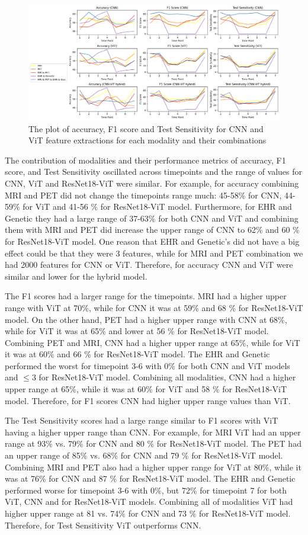 \begin{figure}
    \centering
    \includegraphics[width=1\linewidth]{figs/Picture17_1.png}
    \caption{The plot of accuracy, F1 score and Test Sensitivity for CNN and ViT feature extractions for each modality and their combinations }
    \label{fig:ADprogression}
\end{figure}

The contribution of modalities and their performance metrics of accuracy, F1 score, and Test Sensitivity oscillated across timepoints and the range of values for CNN, ViT and ResNet18-ViT were similar. For example, for accuracy combining MRI and PET did not change the timepoints range much:  45-58\% for CNN, 44-59\% for ViT and 41-56 \% for ResNet18-ViT model. Furthermore, for EHR and Genetic they had a large range of 37-63\% for both CNN and ViT and combining them with MRI and PET did increase the upper range of CNN to 62\% and 60 \% for ResNet18-ViT model. One reason that EHR and Genetic’s did not have a big effect could be that they were 3 features, while for MRI and PET combination we had 2000 features for CNN or ViT. Therefore, for accuracy CNN and ViT were similar and lower for the hybrid model.  

The F1 scores had a larger range for the timepoints. MRI had a higher upper range with ViT at 70\%, while for CNN it was at 59\% and 68 \% for ResNet18-ViT model. On the other hand, PET had a higher upper range with CNN at 68\%, while for ViT it was at 65\% and lower at 56 \% for ResNet18-ViT model. Combining PET and MRI, CNN had a higher upper range at 65\%, while for ViT it was at 60\% and 66 \% for ResNet18-ViT model. The EHR and Genetic performed the worst for timepoint 3-6 with 0\% for both CNN and ViT models and $\leq3$ for ResNet18-ViT model.  Combining all modalities, CNN had a higher upper range at 65\%, while it was at 60\% for ViT and 58 \% for ResNet18-ViT model. Therefore, for F1 scores CNN had higher upper range values than ViT. 

The Test Sensitivity scores had a large range similar to F1 scores with ViT having a higher upper range than CNN. For example, for MRI ViT had an upper range at 93\% vs. 79\% for CNN and 80 \% for ResNet18-ViT model. The PET had an upper range of 85\% vs. 68\% for CNN and 79 \% for ResNet18-ViT model. Combining MRI and PET also had a higher upper range for ViT at 80\%, while it was at 76\% for CNN and 87 \% for ResNet18-ViT model. The EHR and Genetic performed worse for timepoint 3-6 with 0\%, but 72\% for timepoint 7 for both ViT, CNN and for ResNet18-ViT models. Combining all of modalities ViT had higher upper range at 81 vs. 74\% for CNN and 73 \% for ResNet18-ViT model. Therefore, for Test Sensitivity ViT outperforms CNN.